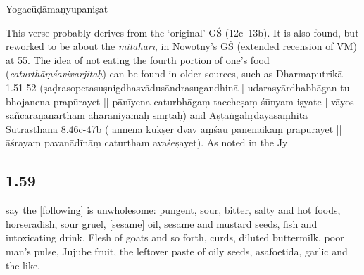 \begin{ekdosis}
\begin{testimonia}[hp01_058]
\begin{versinnote}
\end{versinnote}

Yogacūḍāmaṇyupaniṣat

\begin{versinnote}
\end{versinnote}

\end{testimonia}

\begin{philcomm}[hp01_058]
This verse probably derives from the ‘original’ GŚ (12c–13b). It is also found, but reworked to be about the \emph{mitāhārī}, in Nowotny’s GŚ (extended recension of VM) at 55. The idea of not eating the fourth portion of one’s food (\emph{caturthāṃśavivarjitaḥ}) can be found in older sources, such as Dharmaputrikā 1.51-52 (ṣaḍrasopetasuṣnigdhasvādusāndrasugandhinā |
udarasyārdhabhāgan tu bhojanena prapūrayet || pānīyena caturbhāgaṃ taccheṣaṃ śūnyam iṣyate | vāyos sañcāraṇānārtham āhāraniyamaḥ smṛtaḥ) and Aṣṭāṅgahṛdayasaṃhitā Sūtrasthāna 8.46c-47b ( annena kukṣer dvāv aṃśau pānenaikaṃ prapūrayet ||āśrayaṃ pavanādīnāṃ caturtham avaśeṣayet). As noted in the Jy

\end{philcomm}

\subsection*{1.59}
\begin{translation}[hp01_059]
[Adepts] say the [following] is unwholesome: pungent, sour, bitter, salty and hot foods, horseradish, sour gruel, [sesame] oil, sesame and mustard seeds, fish and intoxicating drink. Flesh of goats and so forth, curds, diluted buttermilk, poor man's pulse, Jujube fruit, the leftover paste of oily seeds, asafoetida, garlic and the like.
\end{translation}

\begin{sources}[hp01_059]
\end{sources}


\end{ekdosis}
